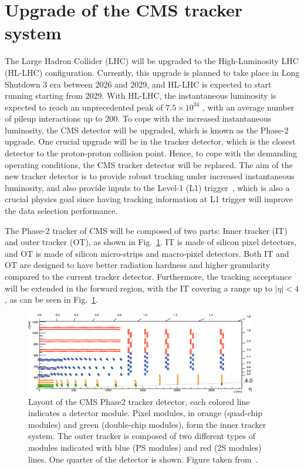 \section{Upgrade of the CMS tracker system}

\graphicspath{{5_Outlook/Figures}}

The Large Hadron Collider (LHC) will be upgraded to the High-Luminosity LHC (HL-LHC) configuration. Currently,
this upgrade is planned to take place in Long Shutdown 3 era between 2026 and 2029, and HL-LHC is expected to 
start running starting from 2029.
With HL-LHC, the instantaneous luminosity is expected to reach an unprecedented peak of
$7.5 \times 10^{34}$ \lumiunit, with an average number of pileup interactions up to $200$. To cope with
the increased instantaneous luminosity, the CMS detector will be upgraded, which is known as the Phase-2 upgrade.
One crucial upgrade will be in the tracker detector, which is the closest detector to the proton-proton collision point. 
Hence, to cope with the demanding operating conditions, the CMS tracker detector will be replaced. The aim of the
new tracker detector is to provide robust tracking under increased instantaneous luminosity, and also provide inputs
to the Level-1 (L1) trigger~\cite{CMS:Phase2TrackerUpgrade}, which is also a crucial physics goal since having tracking
information at L1 trigger will improve the data selection performance.

The Phase-2 tracker of CMS will be composed of two parts:
Inner tracker (IT) and outer tracker (OT), as shown in Fig.~\ref{fig:phase2_tracker_layout}. IT is made of silicon
pixel detectors, and OT is made of silicon micro-strips and macro-pixel detectors.
Both IT and OT are designed to have better radiation hardness and higher
granularity compared to the current tracker detector. Furthermore, the tracking acceptance will be extended
in the forward region, with the IT covering a range up to $|\eta| < 4$, as can be seen in 
Fig.~\ref{fig:phase2_tracker_layout}.

\begin{figure}[htbp]
    \centering
    \includegraphics[width=0.9\textwidth]{TrackerUpgrade/phase2_tracker_layout.jpeg}
    \caption{Layout of the CMS Phase2 tracker detector, each colored line indicates a detector module. 
    Pixel modules, in orange (quad-chip modules) and green (double-chip modules), form the inner tracker system. 
    The outer tracker is composed of two different types of modules indicated with blue (PS modules) and red (2S modules) lines. 
    One quarter of the detector is shown. Figure taken from~\cite{CMS:Phase2TrackerUpgrade}.}
    \label{fig:phase2_tracker_layout}
\end{figure}

